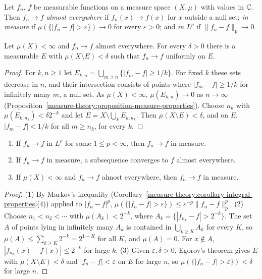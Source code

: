 \begin{definition}\label{measure-theory:definition-modes}
Let $f_n$, $f$ be measurable functions on a measure space $(X, \mu)$ with values in $\mathbb{C}$. Then $f_n \to f$ \emph{almost everywhere} if $f_n(x) \to f(x)$ for $x$ outside a null set; \emph{in measure} if
$\mu(\{|f_n - f| > \varepsilon\}) \to 0$ for every $\varepsilon > 0$; and \emph{in $L^p$} if $\|f_n - f\|_p \to 0$.
\end{definition}

\begin{theorem}[Egorov]\label{measure-theory:theorem-egorov}
Let $\mu(X) < \infty$ and $f_n \to f$ almost everywhere. For every $\delta > 0$ there is a measurable $E$ with $\mu(X \setminus E) < \delta$ such that $f_n \to f$ uniformly on $E$.
\end{theorem}

\begin{proof}
For $k, n \geq 1$ let $E_{k,n} = \bigcup_{m \geq n}\{|f_m - f| \geq 1/k\}$. For fixed $k$ these sets decrease in $n$, and their intersection consists of points where $|f_m - f| \geq 1/k$ for infinitely many $m$, a null set. As
$\mu(X) < \infty$, $\mu(E_{k,n}) \to 0$ as $n \to \infty$ (Proposition~\ref{measure-theory:proposition-measure-properties}). Choose $n_k$ with $\mu(E_{k,n_k}) < \delta2^{-k}$ and let $E = X \setminus \bigcup_kE_{k,n_k}$. Then
$\mu(X \setminus E) < \delta$, and on $E$, $|f_m - f| < 1/k$ for all $m \geq n_k$, for every $k$.
\end{proof}

\begin{proposition}\label{measure-theory:proposition-modes}
\begin{enumerate}
\item If $f_n \to f$ in $L^p$ for some $1 \leq p < \infty$, then $f_n \to f$ in measure.
\item If $f_n \to f$ in measure, a subsequence converges to $f$ almost everywhere.
\item If $\mu(X) < \infty$ and $f_n \to f$ almost everywhere, then $f_n \to f$ in measure.
\end{enumerate}
\end{proposition}

\begin{proof}
(1) By Markov's inequality (Corollary~\ref{measure-theory:corollary-integral-properties}(4)) applied to $|f_n - f|^p$, $\mu(\{|f_n - f| > \varepsilon\}) \leq \varepsilon^{-p}\|f_n - f\|_p^p$. (2) Choose $n_1 < n_2 < \cdots$ with
$\mu(A_k) < 2^{-k}$, where $A_k = \{|f_{n_k} - f| > 2^{-k}\}$. The set $A$ of points lying in infinitely many $A_k$ is contained in $\bigcup_{k \geq K}A_k$ for every $K$, so $\mu(A) \leq \sum_{k \geq K}2^{-k} = 2^{1-K}$ for all $K$, and
$\mu(A) = 0$. For $x \notin A$, $|f_{n_k}(x) - f(x)| \leq 2^{-k}$ for large $k$. (3) Given $\varepsilon, \delta > 0$, Egorov's theorem gives $E$ with $\mu(X \setminus E) < \delta$ and $|f_n - f| < \varepsilon$ on $E$ for large $n$, so
$\mu(\{|f_n - f| > \varepsilon\}) < \delta$ for large $n$.
\end{proof}

